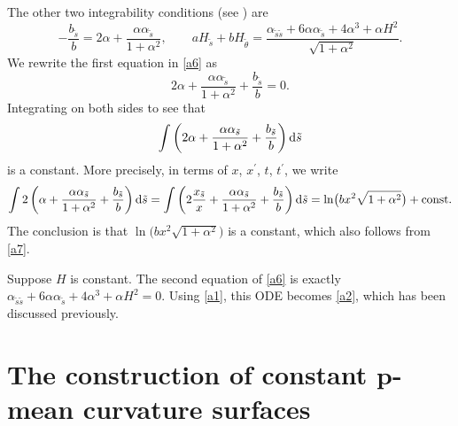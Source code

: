 \documentclass[10pt,a4paper]{amsart}
\numberwithin{equation}{section}
\begin{document}
The other two integrability conditions (see \cite[equation~(2.13)]{ChiuH/LiuH:2022}) are
\begin{equation} \label{a6}
-\frac{b_{\tilde s}}{b} = 2\alpha+\frac{\alpha \alpha_{\tilde s}}{1+\alpha^2
}, \qquad aH_{\tilde s}+bH_{\tilde \theta} =\frac{\alpha_{\tilde s\tilde s}+6\alpha
\alpha_{\tilde s}+4\alpha^3+\alpha H^2}{\sqrt{1+\alpha^2}}.
\end{equation}
We rewrite the first equation in \eqref{a6} as
\begin{equation*}
2\alpha+\frac{\alpha \alpha_{\tilde s}}{1+\alpha^2}+\frac{b_{\tilde s}}{b}=0.
\end{equation*}
Integrating on both sides to see that
\[
\int \left(2\alpha+\frac{\alpha \alpha_{\tilde s}}{1+\alpha^2}+\frac{b_{\tilde s}}{
b}\right){\rm d} \tilde s
\]
is a constant. More precisely, in terms of $x$, $x^{\prime }$, $t$, $t^{\prime }$, we
write
\begin{equation*}
\int 2\left(\alpha+\frac{\alpha \alpha_{\tilde s}}{1+\alpha^2}+\frac{b_{\tilde s}
}{b}\right){\rm d}\tilde s =\int \left(2\frac{x_{\tilde s}}{x}+\frac{\alpha \alpha_{\tilde s}}{1+\alpha^2}+
\frac{b_{\tilde s}}{b}\right){\rm d}\tilde s =\ln\bigl(bx^2\sqrt{1+\alpha^2}\bigr)+\text{\rm const}.
\end{equation*}
The conclusion is that $\ln\bigl(bx^2\sqrt{1+\alpha^2}\bigr)$ is a constant, which
also follows from \eqref{a7}.

Suppose $H$ is constant. The second equation of \eqref{a6} is exactly $
\alpha_{\tilde s\tilde s}+6\alpha \alpha_{\tilde s}+4\alpha^3+\alpha H^2=0$.
Using \eqref{a1}, this ODE becomes \eqref{a2}, which has been discussed
previously.


\section[The construction of constant p-mean curvature surfaces]{The construction of constant $\boldsymbol{ p}$-mean curvature surfaces}\label{ccpms}
\end{document}
